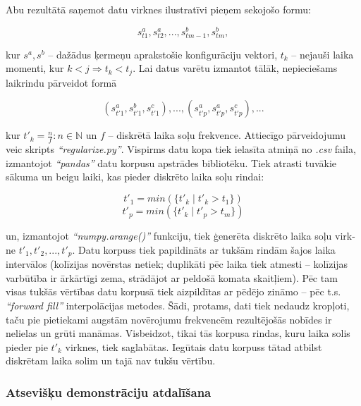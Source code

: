 \documentclass[12pt, a4paper]{article}
\numberwithin{equation}{section} %
\begin{document}
Abu rezultātā saņemot datu virknes ilustratīvi pieņem sekojošo formu:


\begin{equation}
    s^a_{t1}, s^a_{t2}, ..., s^b_{tm-1}, s^b_{tm},
\end{equation}

kur $s^a, s^b$ -- dažādus ķermeņu aprakstošie konfigurāciju vektori, $t_k$ -- nejauši laika momenti, kur $k < j \Rightarrow t_k < t_j$. Lai datus varētu izmantot tālāk, nepieciešams laikrindu pārveidot formā

\begin{equation}
    (s^a_{t'1}, s^b_{t'1}, s^c_{t'1}), ..., (s^a_{t'p}, s^a_{t'p}, s^c_{t'p}), ...
\end{equation}

kur $t'_k = \frac{n}{f}: n \in \mathbb{N}$ un $f$ -- diskrētā laika soļu frekvence. Attiecīgo pārveidojumu veic skripts \textit{``regularize.py''}. Vispirms datu kopa tiek ielasīta atmiņā no \textit{.csv} faila, izmantojot \textit{``pandas''} datu korpusu apstrādes bibliotēku. Tiek atrasti tuvākie sākuma un beigu laiki, kas pieder diskrēto laika soļu rindai:

\begin{equation}
    t'_1 = min(\lbrace t'_k \mid t'_k > t_1 \rbrace)
\end{equation}
\begin{equation}
    t'_p = min(\lbrace t'_k \mid t'_p > t_m \rbrace)
\end{equation}

un, izmantojot \textit{``numpy.arange()''} funkciju, tiek ģenerēta diskrēto laika soļu virk-ne $t'_1, t'_2, ..., t'_p$. Datu korpuss tiek papildināts ar tukšām rindām šajos laika intervālos (kolīzijas novērstas netiek; duplikāti pēc laika tiek atmesti -- kolīzijas varbūtība ir ārkārtīgi zema, strādājot ar peldošā komata skaitļiem). Pēc tam visas tukšās vērtības datu korpusā tiek aizpildītas ar pēdējo zināmo -- pēc t.s. \textit{``forward fill''} interpolācijas metodes. Šādi, protams, dati tiek nedaudz kropļoti, taču pie pietiekami augstām novērojumu frekvencēm rezultējošās nobīdes ir nelielas un grūti manāmas. Visbeidzot, tikai tās korpusa rindas, kuru laika solis pieder pie $t'_k$ virknes, tiek saglabātas. Iegūtais datu korpuss tātad atbilst diskrētam laika solim un tajā nav tukšu vērtību.

\subsubsection{Atsevišķu demonstrāciju atdalīšana}
\end{document}
